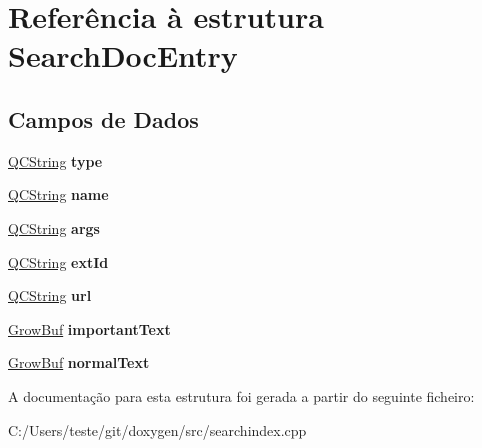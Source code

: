 \hypertarget{struct_search_doc_entry}{\section{Referência à estrutura Search\-Doc\-Entry}
\label{struct_search_doc_entry}
}
\subsection*{Campos de Dados}
\begin{DoxyCompactItemize}
\item 
\hypertarget{struct_search_doc_entry_a0d4463771e24026060ae68b04822d7af}{\hyperlink{class_q_c_string}{Q\-C\-String} {\bfseries type}}\label{struct_search_doc_entry_a0d4463771e24026060ae68b04822d7af}

\item 
\hypertarget{struct_search_doc_entry_adc0097c7bd1e61ad32058fcde425bc7a}{\hyperlink{class_q_c_string}{Q\-C\-String} {\bfseries name}}\label{struct_search_doc_entry_adc0097c7bd1e61ad32058fcde425bc7a}

\item 
\hypertarget{struct_search_doc_entry_a5691dacbac7b651cd43288adc0d0328b}{\hyperlink{class_q_c_string}{Q\-C\-String} {\bfseries args}}\label{struct_search_doc_entry_a5691dacbac7b651cd43288adc0d0328b}

\item 
\hypertarget{struct_search_doc_entry_aeecebaabacec030f0031ea0083aed165}{\hyperlink{class_q_c_string}{Q\-C\-String} {\bfseries ext\-Id}}\label{struct_search_doc_entry_aeecebaabacec030f0031ea0083aed165}

\item 
\hypertarget{struct_search_doc_entry_ae460a12583d5413f9b10d653d645416e}{\hyperlink{class_q_c_string}{Q\-C\-String} {\bfseries url}}\label{struct_search_doc_entry_ae460a12583d5413f9b10d653d645416e}

\item 
\hypertarget{struct_search_doc_entry_ab5d9dac29016caf286a544e43a14b6f8}{\hyperlink{class_grow_buf}{Grow\-Buf} {\bfseries important\-Text}}\label{struct_search_doc_entry_ab5d9dac29016caf286a544e43a14b6f8}

\item 
\hypertarget{struct_search_doc_entry_a83e30f5612e88514c82d5af84c7b4f3e}{\hyperlink{class_grow_buf}{Grow\-Buf} {\bfseries normal\-Text}}\label{struct_search_doc_entry_a83e30f5612e88514c82d5af84c7b4f3e}

\end{DoxyCompactItemize}


A documentação para esta estrutura foi gerada a partir do seguinte ficheiro\-:\begin{DoxyCompactItemize}
\item 
C\-:/\-Users/teste/git/doxygen/src/searchindex.\-cpp\end{DoxyCompactItemize}

